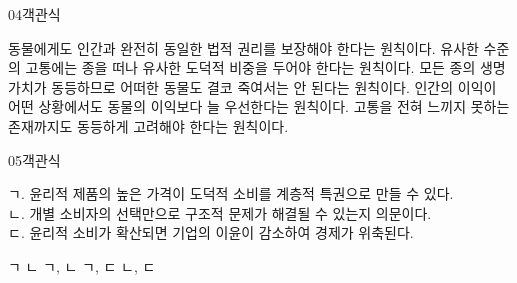 \documentclass[fs85,seriesWit]{korfarm-base}
\begin{document}
\begin{kfQBlock}{04}{객관식}
\begin{kfChoices}
\kfChoice 동물에게도 인간과 완전히 동일한 법적 권리를 보장해야 한다는 원칙이다.
\kfChoice 유사한 수준의 고통에는 종을 떠나 유사한 도덕적 비중을 두어야 한다는 원칙이다.
\kfChoice 모든 종의 생명 가치가 동등하므로 어떠한 동물도 결코 죽여서는 안 된다는 원칙이다.
\kfChoice 인간의 이익이 어떤 상황에서도 동물의 이익보다 늘 우선한다는 원칙이다.
\kfChoice 고통을 전혀 느끼지 못하는 존재까지도 동등하게 고려해야 한다는 원칙이다.
\end{kfChoices}
\end{kfQBlock}

\begin{kfQBlock}{05}{객관식}
\begin{kfEvidence}ㄱ. 윤리적 제품의 높은 가격이 도덕적 소비를 계층적 특권으로 만들 수 있다. \\\relax
ㄴ. 개별 소비자의 선택만으로 구조적 문제가 해결될 수 있는지 의문이다. \\\relax
ㄷ. 윤리적 소비가 확산되면 기업의 이윤이 감소하여 경제가 위축된다.\end{kfEvidence}
\begin{kfChoices}
\kfChoice ㄱ
\kfChoice ㄴ
\kfChoice ㄱ, ㄴ
\kfChoice ㄱ, ㄷ
\kfChoice ㄴ, ㄷ
\end{kfChoices}
\end{kfQBlock}

\kfEndMC

\end{document}
